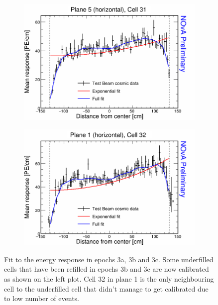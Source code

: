 \begin{figure}[h]
  \begin{subfigure}{0.495\textwidth}
    \includegraphics[width=\linewidth]{Plots/RelativeCalibrationResults/ep3abc_005_031.png}
  \end{subfigure}
  \begin{subfigure}{0.495\textwidth}
    \includegraphics[width=\linewidth]{Plots/RelativeCalibrationResults/ep3abc_001_032.png}
  \end{subfigure}
  \caption[Attenuation fits for re-filled cells in period 3 data]{Fit to the energy response in epochs 3a, 3b and 3c. Some underfilled cells that have been refilled in epochs 3b and 3c are now calibrated as shown on the left plot. Cell 32 in plane 1 is the only neighbouring cell to the underfilled cell that didn't manage to get calibrated due to low number of events.}
  \label{fig:AttenfitResultsEpoch3abc_UnderfilledCellsNeighbours}
\end{figure}

